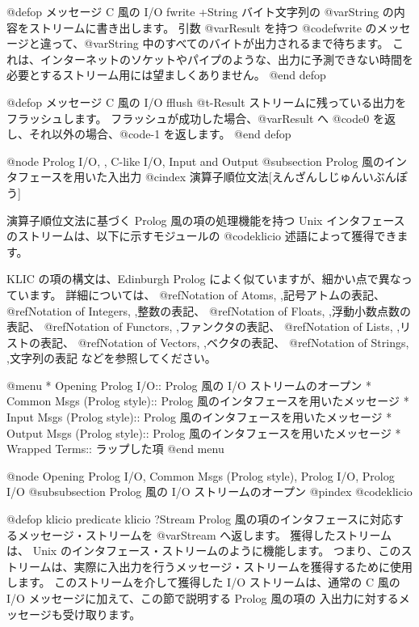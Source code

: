 {{{{@defop {メッセージ} {C 風の I/O }  fwrite +String
バイト文字列の @var{String} の内容をストリームに書き出します。
引数 @var{Result} を持つ @code{fwrite} のメッセージと違って、@var{String} 中のすべてのバイトが出力されるまで待ちます。
これは、インターネットのソケットやパイプのような、出力に予測できない時間を必要とするストリーム用には望ましくありません。
@end defop

@defop {メッセージ} {C 風の I/O }  fflush @t{-}Result
ストリームに残っている出力をフラッシュします。
フラッシュが成功した場合、@var{Result} へ @code{0} を返し、それ以外の場合、@code{-1} を返します。
@end defop

@node Prolog I/O,  , C-like I/O, Input and Output
@subsection Prolog 風のインタフェースを用いた入出力
@cindex 演算子順位文法[えんざんしじゅんいぶんぽう]

演算子順位文法に基づく Prolog 風の項の処理機能を持つ Unix インタフェースのストリームは、以下に示すモジュールの @code{klicio} 述語によって獲得できます。

KLIC の項の構文は、Edinburgh Prolog によく似ていますが、細かい点で異なっています。
詳細については、
@ref{Notation of Atoms, ,記号アトムの表記}、
@ref{Notation of Integers, ,整数の表記}、
@ref{Notation of Floats, ,浮動小数点数の表記}、
@ref{Notation of Functors, ,ファンクタの表記}、
@ref{Notation of Lists, ,リストの表記}、
@ref{Notation of Vectors, ,ベクタの表記}、
@ref{Notation of Strings, ,文字列の表記}
などを参照してください。

@menu
* Opening Prolog I/O::          Prolog 風の I/O ストリームのオープン
* Common Msgs (Prolog style)::  Prolog 風のインタフェースを用いたメッセージ
* Input Msgs (Prolog style)::   Prolog 風のインタフェースを用いたメッセージ
* Output Msgs (Prolog style)::  Prolog 風のインタフェースを用いたメッセージ
* Wrapped Terms::               ラップした項
@end menu

@node Opening Prolog I/O, Common Msgs (Prolog style), Prolog I/O, Prolog I/O
@subsubsection Prolog 風の I/O ストリームのオープン
@pindex @code{klicio}

@defop {klicio } {predicate} klicio ?Stream
Prolog 風の項のインタフェースに対応するメッセージ・ストリームを @var{Stream} へ返します。
獲得したストリームは、 Unix のインタフェース・ストリームのように機能します。
つまり、このストリームは、実際に入出力を行うメッセージ・ストリームを獲得するために使用します。
このストリームを介して獲得した I/O ストリームは、通常の C 風の I/O メッセージに加えて、この節で説明する Prolog 風の項の 入出力に対するメッセージも受け取ります。

}}}}
